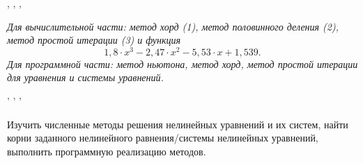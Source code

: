 


\tableofcontents


\newpage
\Chapter{\lab\ \labnumber}{\labtheme}{}

\begin{center}
, , ,
\end{center}
\textit{%
    Для вычислительной части: метод хорд (1), метод половинного деления (2), метод простой итерации (3) и функция
}
$$1,8 \cdot x^3 - 2,47 \cdot x^2 - 5,53 \cdot x + 1,539.$$
\textit{%
    Для программной части: метод ньютона, метод хорд, метод простой итерации для уравнения и системы уравнений.
}
\begin{center}
' ' '
\end{center}

Изучить численные методы решения нелинейных уравнений и их систем, найти корни заданного нелинейного равнения/системы нелинейных уравнений, выполнить программную реализацию методов.

